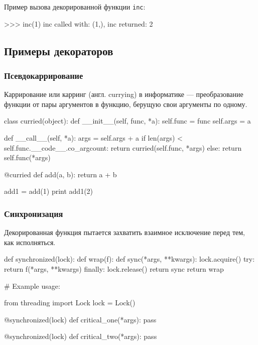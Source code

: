 Пример вызова декорированной функции \lstinline{inc}:
\begin{pylst}{}{}
>>> inc(1)
inc called with: (1,), {}
inc returned: 2
\end{pylst}

\subsection{Примеры декораторов}
\subsubsection{Псевдокаррирование}
Каррирование или карринг (англ. currying) в информатике --- преобразование функции от пары аргументов в функцию, берущую свои аргументы по одному.
\begin{pylst}{}{}
class curried(object):
    def __init__(self, func, *a):
        self.func = func
        self.args = a

    def __call__(self, *a):
        args = self.args + a
        if len(args) < self.func.__code__.co_argcount:
            return curried(self.func, *args)
        else:
            return self.func(*args)

@curried
def add(a, b):
    return a + b

add1 = add(1)
print add1(2)
\end{pylst}

\subsubsection{Синхронизация}
Декорированная функция пытается захватить взаимное исключение перед тем, как исполняться.

\begin{pylst}{}{}
def synchronized(lock):
    def wrap(f):
        def sync(*args, **kwargs):
            lock.acquire()
            try:
                return f(*args, **kwargs)
            finally:
                lock.release()
        return sync
    return wrap

# Example usage:

from threading import Lock
lock = Lock()

@synchronized(lock)
def critical_one(*args):
    pass

@synchronized(lock)
def critical_two(*args):
    pass
\end{pylst}

